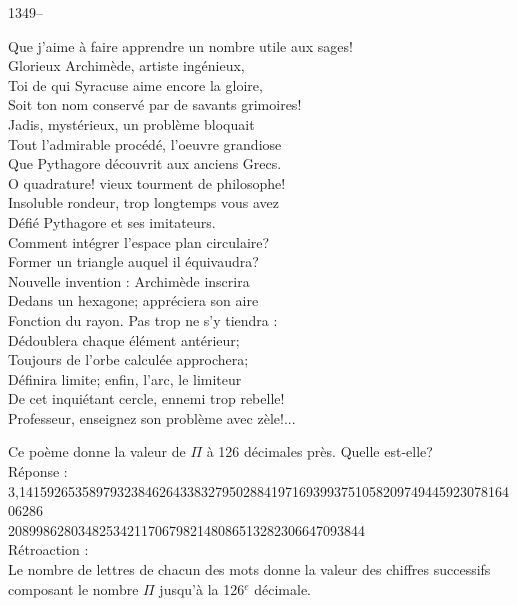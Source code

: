 ﻿\documentclass[letterpaper, 12pt]{article}
\begin{document}
1349--\begin{center}{Que j'aime \`a faire apprendre un nombre utile aux
sages! \\
Glorieux Archim\`ede, artiste ing\'enieux,\\
Toi de qui Syracuse aime encore la gloire,\\
Soit ton nom conserv\'e par de savants grimoires! \\
Jadis, myst\'erieux, un probl\`eme bloquait \\
Tout l'admirable proc\'ed\'e, l'oeuvre grandiose\\
Que Pythagore d\'ecouvrit aux anciens Grecs. \\
O quadrature! vieux tourment de philosophe!\\
Insoluble rondeur, trop longtemps vous avez \\
D\'efi\'e Pythagore et ses imitateurs. \\
Comment int\'egrer l'espace plan circulaire?\\
Former un triangle auquel il \'equivaudra? \\
Nouvelle invention : Archim\`ede inscrira \\
Dedans un hexagone; appr\'eciera son aire \\
Fonction du rayon. Pas trop ne s'y tiendra :\\
D\'edoublera chaque \'el\'ement ant\'erieur; \\
Toujours de l'orbe calcul\'ee approchera;\\
D\'efinira limite; enfin, l'arc, le limiteur\\
De cet inqui\'etant cercle, ennemi trop rebelle!\\
Professeur, enseignez son probl\`eme avec z\`ele!...\\}
\end{center}
Ce po\`eme donne la valeur de $\Pi$ \`a 126  d\'ecimales pr\`es. Quelle
est-elle?\\

R\'eponse : \\
3,141592653589793238462643383279502884197169399375105820974944592307816406286\\
208998628034825342117067982148086513282306647093844\\

R\'etroaction : \\

Le nombre de lettres de chacun des mots donne la valeur des chiffres
successifs composant le nombre $\Pi$ jusqu'\`a la 126$^e$ d\'ecimale.\\
\end{document}
